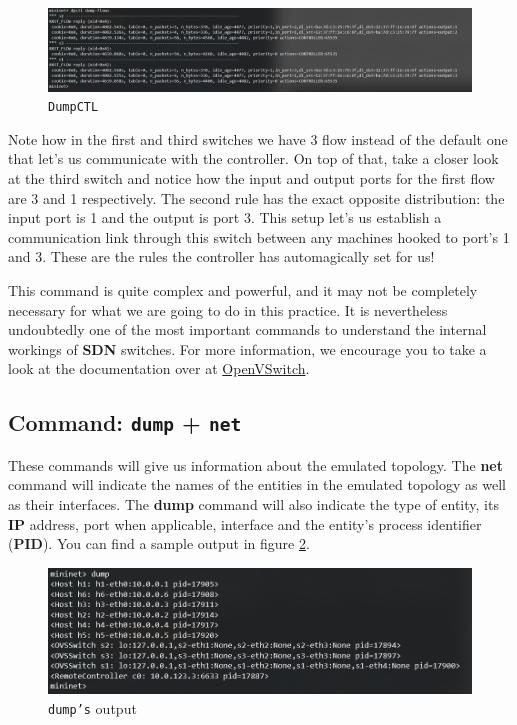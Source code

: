 \documentclass[12pt]{article}
\newcommand{\newpar} {
    \vskip 1cm
}
\begin{document}
		\begin{figure}[!htb]
			\centering
			\includegraphics[width=\linewidth]{dpctl.png}
			\caption{\texttt{DumpCTL}}
			\label{f:dpctl}
		\end{figure}

		Note how in the first and third switches we have 3 flow instead of the default one that let's us communicate with the controller. On top of that, take a closer look at the third switch and notice how the input and output ports for the first flow are 3 and 1 respectively. The second rule has the exact opposite distribution: the input port is 1 and the output is port 3. This setup let's us establish a communication link through this switch between any machines hooked to port's 1 and 3. These are the rules the controller has automagically set for us!
		\newpar
		This command is quite complex and powerful, and it may not be completely necessary for what we are going to do in this practice. It is nevertheless undoubtedly one of the most important commands to understand the internal workings of \textbf{SDN} switches. For more information, we encourage you to take a look at the documentation over at \href{http://www.openvswitch.org/support/dist-docs/ovs-ofctl.8.txt}{OpenVSwitch}.

	\subsection{Command: \texttt{dump} + \texttt{net}}
		These commands will give us information about the emulated topology. The \textbf{net} command will indicate the names of the entities in the emulated topology as well as their interfaces. The \textbf{dump} command will also indicate the type of entity, its \textbf{IP} address, port when applicable, interface and the entity's process identifier (\textbf{PID}). You can find a sample output in figure \ref{f:dump}.

        \newpage
		\begin{figure}[!htb]
			\centering
			\includegraphics[width=\linewidth]{dump.png}
			\caption{\texttt{dump's} output}
			\label{f:dump}
		\end{figure}
\end{document}
